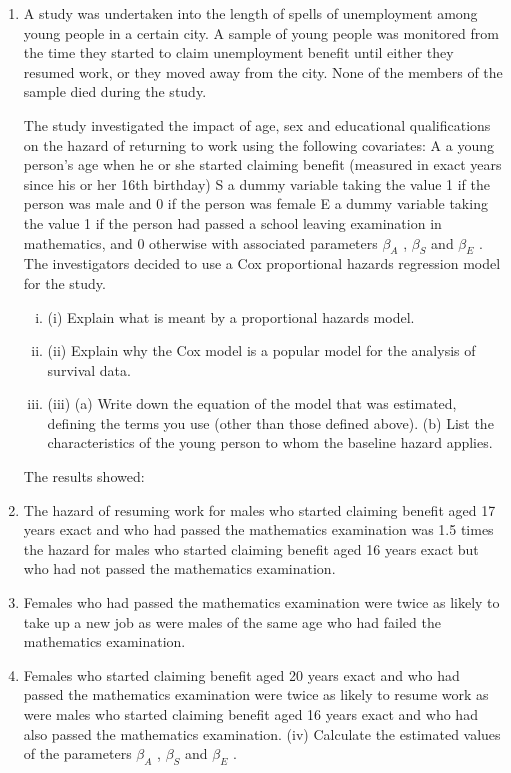 \documentclass[a4paper,12pt]{article}
\begin{document}
\begin{enumerate}
\item A study was undertaken into the length of spells of unemployment among young people in a certain city. A sample of young people was monitored from the time they
started to claim unemployment benefit until either they resumed work, or they moved
away from the city. None of the members of the sample died during the study.

The study investigated the impact of age, sex and educational qualifications on the hazard of returning to work using the following covariates:
A a young person’s age when he or she started claiming benefit (measured in exact years since his or her 16th birthday)
S a dummy variable taking the value 1 if the person was male and 0 if the person was female
E a dummy variable taking the value 1 if the person had passed a school leaving examination in mathematics, and 0 otherwise
with associated parameters $\beta_A$ , $\beta_S$ and $\beta_E$ .
The investigators decided to use a Cox proportional hazards regression model for the
study.

\begin{enumerate}[(i)]
\item (i) Explain what is meant by a proportional hazards model.

\item (ii) Explain why the Cox model is a popular model for the analysis of survival
data.

\item (iii) (a)
Write down the equation of the model that was estimated, defining
the terms you use (other than those defined above).
(b)
List the characteristics of the young person to whom the baseline
hazard applies.
\end{enumerate}
The results showed:
\item The hazard of resuming work for males who started claiming benefit aged 17 years exact and who had passed the mathematics examination was 1.5 times the
hazard for males who started claiming benefit aged 16 years exact but who had not passed the mathematics examination.
\item Females who had passed the mathematics examination were twice as likely to take
up a new job as were males of the same age who had failed the mathematics
examination.
\item Females who started claiming benefit aged 20 years exact and who had passed the
mathematics examination were twice as likely to resume work as were males who
started claiming benefit aged 16 years exact and who had also passed the
mathematics examination.
(iv)
Calculate the estimated values of the parameters $\beta_A$ , $\beta_S$ and $\beta_E$ .


\end{enumerate}
\end{document}
